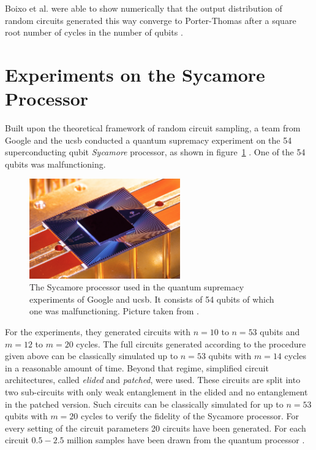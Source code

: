 Boixo et al. were able to show numerically that the output distribution of random circuits generated this way
converge to Porter-Thomas after a square root
number of cycles in the number of qubits \cite{Boixo2018supremacy}.

\section{Experiments on the Sycamore Processor}
\label{sec:experiments_sycamore}

Built upon the theoretical framework of random circuit sampling,
a team from Google and the \gls{ucsb} conducted a quantum
supremacy experiment on the 54 superconducting qubit \textit{Sycamore}
processor, as shown in figure~\ref{fig:sycamore} \cite{martines2019supremacy}.
One of the 54 qubits was malfunctioning.

\begin{figure}[H]
  \centering
  \includegraphics[width=0.58\textwidth]{figures/sycamore}
  \caption[The Sycamore Processor]{The Sycamore processor used in the quantum supremacy experiments of Google and \gls{ucsb}. It consists of 54 qubits of which one was malfunctioning. Picture taken from \cite{martines2019supremacy}.}
  \label{fig:sycamore}
\end{figure}

For the experiments, they generated circuits with $n=10$ to $n=53$ qubits and
$m=12$ to $m=20$ cycles. The full circuits generated according to the procedure
given above can be classically simulated up to $n=53$ qubits with $m=14$ cycles
in a reasonable amount of time. Beyond that regime, simplified circuit
architectures, called \textit{elided} and \textit{patched}, were used. These circuits
are split into two sub-circuits with only weak entanglement in the elided and no
entanglement in the patched version. Such circuits can be classically simulated for up to $n=53$ qubits with $m=20$ cycles to
verify the fidelity of the Sycamore processor. For every setting of the circuit parameters 20
circuits have been generated. For each circuit $0.5-2.5$ million samples have been drawn
from the quantum processor \cite{martines2019supremacy}.

